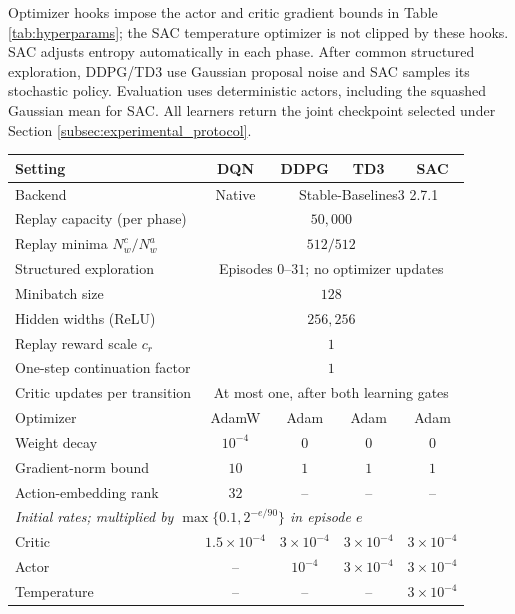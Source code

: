\documentclass[11pt]{article}
\begin{document}
Optimizer hooks impose the actor and critic gradient bounds in Table \ref{tab:hyperparams}; the SAC temperature optimizer is not clipped by these hooks. SAC adjusts entropy automatically in each phase. After common structured exploration, DDPG/TD3 use Gaussian proposal noise and SAC samples its stochastic policy. Evaluation uses deterministic actors, including the squashed Gaussian mean for SAC. All learners return the joint checkpoint selected under Section \ref{subsec:experimental_protocol}.

\begin{table}[ht!]


\centering
\setlength{\tabcolsep}{4pt}
\renewcommand{\arraystretch}{1.04}
\begin{tabular}{lcccc}
\toprule
\textbf{Setting} & \textbf{DQN} & \textbf{DDPG} & \textbf{TD3} & \textbf{SAC} \\
\midrule
Backend & Native & \multicolumn{3}{c}{Stable-Baselines3 2.7.1} \\
Replay capacity (per phase) & \multicolumn{4}{c}{$50{,}000$} \\
Replay minima $N_w^c/N_w^a$ & \multicolumn{4}{c}{$512/512$} \\
Structured exploration & \multicolumn{4}{c}{Episodes $0$--$31$; no optimizer updates} \\
Minibatch size & \multicolumn{4}{c}{$128$} \\
Hidden widths (ReLU) & \multicolumn{4}{c}{$256,256$} \\
Replay reward scale $c_r$ & \multicolumn{4}{c}{$1$} \\
One-step continuation factor & \multicolumn{4}{c}{$1$} \\
Critic updates per transition & \multicolumn{4}{c}{At most one, after both learning gates} \\
Optimizer & AdamW & Adam & Adam & Adam \\
Weight decay & $10^{-4}$ & $0$ & $0$ & $0$ \\
Gradient-norm bound & $10$ & $1$ & $1$ & $1$ \\
Action-embedding rank & $32$ & -- & -- & -- \\
\midrule
\multicolumn{5}{l}{\emph{Initial rates; multiplied by $\max\{0.1,2^{-e/90}\}$ in episode $e$}}\\
Critic & $1.5\times10^{-4}$ & $3\times10^{-4}$ & $3\times10^{-4}$ & $3\times10^{-4}$ \\
Actor & -- & $10^{-4}$ & $3\times10^{-4}$ & $3\times10^{-4}$ \\
Temperature & -- & -- & -- & $3\times10^{-4}$ \\

\end{tabular}
\end{table}
\end{document}
